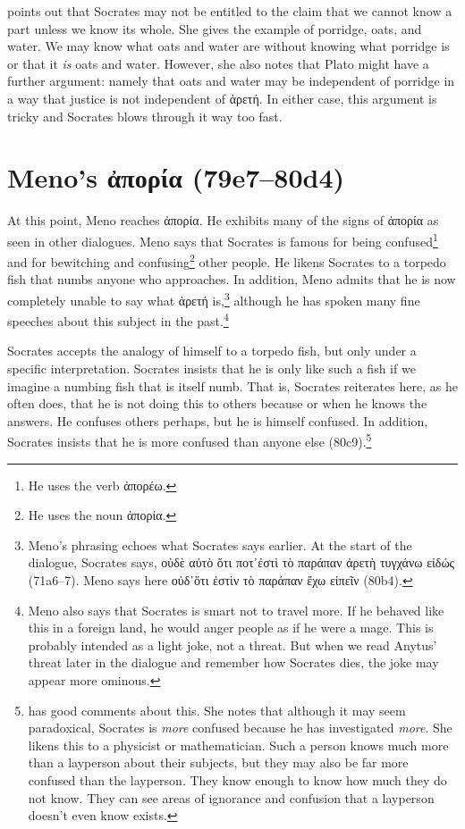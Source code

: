 \documentclass[12pt,letterpaper]{article}
\begin{document}
\textcite[59]{fine2014} points out that Socrates may not be entitled to the claim that we cannot know a part unless we know its whole. She gives the example of porridge, oats, and water. We may know what oats and water are without knowing what porridge is or that it \textit{is} oats and water. However, she also notes that Plato might have a further argument: namely that oats and water may be independent of porridge in a way that justice is not independent of \textgreek{ἀρετή}. In either case, this argument is tricky and Socrates blows through it way too fast.  

\section{Meno's \textgreek{ἀπορία} (79e7--80d4)}

At this point, Meno reaches \textgreek{ἀπορία}. He exhibits many of the signs of \textgreek{ἀπορία} as seen in other dialogues. Meno says that Socrates is famous for being confused\footnote{He uses the verb \textgreek{ἀπορέω}.} and for bewitching and confusing\footnote{He uses the noun \textgreek{ἀπορία}.} other people. He likens Socrates to a torpedo fish that numbs anyone who approaches. In addition, Meno admits that he is now completely unable to say what \textgreek{ἀρετή} is,\footnote{Meno's phrasing echoes what Socrates says earlier. At the start of the dialogue, Socrates says, \textgreek{οὐδὲ αὐτὸ ὅτι ποτ᾽ἐστὶ τὸ παράπαν ἀρετὴ τυγχάνω εἰδώς} (71a6--7). Meno says here \textgreek{οὐδ᾽ὅτι ἐστὶν τὸ παράπαν ἔχω εἰπεῖν} (80b4).} although he has spoken many fine speeches about this subject in the past.\footnote{Meno also says that Socrates is smart not to travel more. If he behaved like this in a foreign land, he would anger people as if he were a mage. This is probably intended as a light joke, not a threat. But when we read Anytus' threat later in the dialogue and remember how Socrates dies, the joke may appear more ominous.}

Socrates accepts the analogy of himself to a torpedo fish, but only under a specific interpretation. Socrates insists that he is only like such a fish if we imagine a numbing fish that is itself numb. That is, Socrates reiterates here, as he often does, that he is not doing this to others because or when he knows the answers. He confuses others perhaps, but he is himself confused. In addition, Socrates insists that he is more confused than anyone else (80c9).\footnote{\textcite[71--72]{fine2014} has good comments about this. She notes that although it may seem paradoxical, Socrates is \textit{more} confused because he has investigated \textit{more}. She likens this to a physicist or mathematician. Such a person knows much more than a layperson about their subjects, but they may also be far more confused than the layperson. They know enough to know how much they do not know. They can see areas of ignorance and confusion that a layperson doesn't even know exists.}
\end{document}
